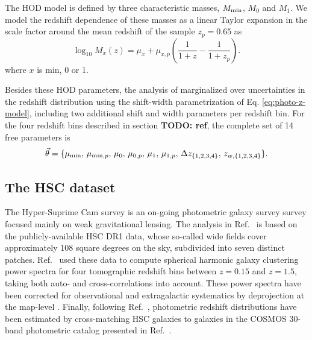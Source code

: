 \documentclass[a4paper,11pt]{article}
\newcommand{\todo}[1]{{\bf TODO: #1}}
\begin{document}
    The HOD model is defined by three characteristic masses, $M_{\rm min}$, $M_0$ and $M_1$. We model the redshift dependence of these masses as a linear Taylor expansion in the scale factor around the mean redshift of the sample $z_p=0.65$ as
    \begin{equation}
      \log_{10}{M_x(z)} = \mu_x + \mu_{x, p} \left(\frac{1}{1+z} - \frac{1}{1+z_{p}}\right).
    \end{equation}
    where $x$ is $\mathrm{min}$, 0 or 1.
    
    Besides these HOD parameters, the analysis of \cite{1912.08209} marginalized over uncertainties in the redshift distribution using the shift-width parametrization of Eq. \ref{eq:photo-z-model}, including two additional shift and width parameters per redshift bin. For the four redshift bins described in section \todo{ref}, the complete set of 14 free parameters is
    \begin{equation}
      \vec{\theta}=\{\mu_{\rm min},\,\mu_{{\rm min},p},\,\mu_0,\,\mu_{0,p},\,\mu_1,\,\mu_{1,p},\,\Delta z_{\{1,2,3,4\}},\,z_{w,\{1,2,3,4\}}\}.
    \end{equation}

\subsection{The HSC dataset}
The Hyper-Suprime Cam survey is an on-going photometric galaxy survey survey focused mainly on weak gravitational lensing. The analysis in Ref.~\cite{1912.08209} is based on the publicly-available HSC DR1 data, whose so-called wide fields cover approximately 108 square degrees on the sky, subdivided into seven distinct patches. Ref.~\cite{1912.08209} used these data to compute spherical harmonic galaxy clustering power spectra for four tomographic redshift bins between $z=0.15$ and $z=1.5$, taking both auto- and cross-correlations into account. These power spectra have been corrected for observational and extragalactic systematics by deprojection at the map-level \cite{2019MNRAS.484.4127A}. Finally, following Ref.~\cite{2019PASJ...71...43H}, photometric redshift distributions have been estimated by cross-matching HSC galaxies to galaxies in the COSMOS 30-band photometric catalog presented in Ref.~\cite{2016ApJS..224...24L}.
\end{document}
